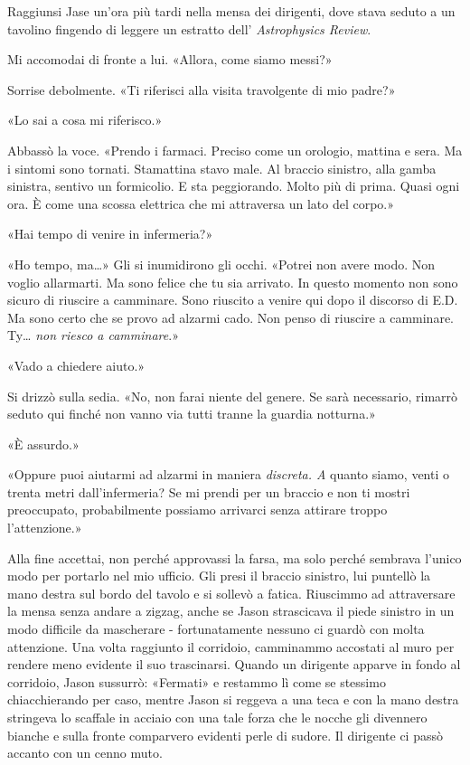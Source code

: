 Raggiunsi Jase un'ora più tardi nella mensa dei dirigenti, dove stava
seduto a un tavolino fingendo di leggere un estratto dell'
\emph{Astrophysics Review}.

Mi accomodai di fronte a lui. «Allora, come siamo messi?»

Sorrise debolmente. «Ti riferisci alla visita travolgente di mio padre?»

«Lo sai a cosa mi riferisco.»

Abbassò la voce. «Prendo i farmaci. Preciso come un orologio, mattina e
sera. Ma i sintomi sono tornati. Stamattina stavo male. Al braccio
sinistro, alla gamba sinistra, sentivo un formicolio. E sta peggiorando.
Molto più di prima. Quasi ogni ora. È come una scossa elettrica che mi
attraversa un lato del corpo.»

«Hai tempo di venire in infermeria?»

«Ho tempo, ma\ldots» Gli si inumidirono gli occhi. «Potrei non avere
modo. Non voglio allarmarti. Ma sono felice che tu sia arrivato. In
questo momento non sono sicuro di riuscire a camminare. Sono riuscito a
venire qui dopo il discorso di E.D. Ma sono certo che se provo ad
alzarmi cado. Non penso di riuscire a camminare. Ty\ldots{} \emph{non
	riesco a camminare}.»

«Vado a chiedere aiuto.»

Si drizzò sulla sedia. «No, non farai niente del genere. Se sarà
necessario, rimarrò seduto qui finché non vanno via tutti tranne la
guardia notturna.»

«È assurdo.»

«Oppure puoi aiutarmi ad alzarmi in maniera \emph{discreta. A} quanto
siamo, venti o trenta metri dall'infermeria? Se mi prendi per un braccio
e non ti mostri preoccupato, probabilmente possiamo arrivarci senza
attirare troppo l'attenzione.»

Alla fine accettai, non perché approvassi la farsa, ma solo perché
sembrava l'unico modo per portarlo nel mio ufficio. Gli presi il braccio
sinistro, lui puntellò la mano destra sul bordo del tavolo e si sollevò
a fatica. Riuscimmo ad attraversare la mensa senza andare a zigzag,
anche se Jason strascicava il piede sinistro in un modo difficile da
mascherare - fortunatamente nessuno ci guardò con molta attenzione. Una
volta raggiunto il corridoio, camminammo accostati al muro per rendere
meno evidente il suo trascinarsi. Quando un dirigente apparve in fondo
al corridoio, Jason sussurrò: «Fermati» e restammo lì come se stessimo
chiacchierando per caso, mentre Jason si reggeva a una teca e con la
mano destra stringeva lo scaffale in acciaio con una tale forza che le
nocche gli divennero bianche e sulla fronte comparvero evidenti perle di
sudore. Il dirigente ci passò accanto con un cenno muto.


